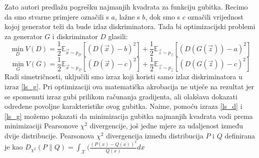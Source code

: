 Zato autori predlažu pogrešku najmanjih kvadrata za funkciju gubitka. Recimo da smo stvarne primjere označili s $a$, lažne s $b$, dok smo s $c$ označili vrijednost kojoj generator teži da bude izlaz diskriminatora. Tada bi optimizacijski problemi za generator $G$ i diskriminator $D$ glasili:
\begin{equation}
\label{ls_d}
\min_D V(D) = \frac{1}{2}\mathbb{E}_{\vec{x} \sim p_{\mathcal{D}}}\left[(D(\vec{x}) - b)^2\right] + \frac{1}{2}\mathbb{E}_{\vec{z} \sim p_{\vec{z}}}\left[(D(G(\vec{z})) - a)^2\right]
\end{equation}
\begin{equation}
\label{ls_g}
\min_G V(G) = \frac{1}{2}\mathbb{E}_{\vec{x} \sim p_{\mathcal{D}}}\left[(D(\vec{x}) - c)^2\right] + \frac{1}{2}\mathbb{E}_{\vec{z} \sim p_{\vec{z}}}\left[(D(G(\vec{z})) - c)^2\right]
\end{equation}
Radi simetričnosti, uključili smo izraz koji koristi samo izlaz diskriminatora u izraz \ref{ls_g}. Pri optimizaciji ova matematička akrobacija ne utječe na rezultat jer se spomenuti izraz gubi prilikom računanja gradijenta, ali olakšava dokazati određene povoljne karakteristike ovog gubitka. Naime, pomoću izraza \ref{ls_d} i \ref{ls_g} možemo pokazati da minimizacija gubitka najmanjih kvadrata vodi prema minimizaciji Pearsonove $\chi^2$ divergencije, još jedne mjere za udaljenost između dvije distribucije. Pearsonova $\chi^2$ divergencija između distribucija $P$ i $Q$ definirana je kao $D_{\chi^2}(P\|Q) = \int_{\mathcal{X}} (\frac{(P(x) - Q(x))^2}{Q(x)}dx$

